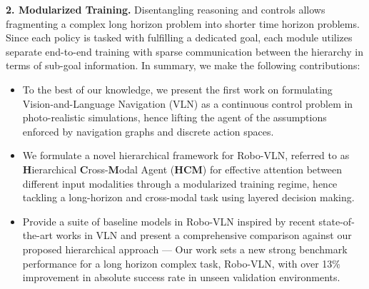 \documentclass[letter, 10pt, conference]{ieeeconf}
\begin{document}
\textbf{2. Modularized Training.}
Disentangling reasoning and controls allows fragmenting a complex long horizon problem into shorter time horizon problems.
Since each policy is tasked with fulfilling a dedicated goal, each module utilizes separate end-to-end training with sparse communication between the hierarchy in terms of sub-goal information.
In summary, we make the following contributions: 
\begin{itemize}

\item To the best of our knowledge, we present the first work on formulating Vision-and-Language Navigation (VLN) as a continuous control problem in photo-realistic simulations, hence lifting the agent of the assumptions enforced by navigation graphs and discrete action spaces.

\item We formulate a novel hierarchical framework for Robo-VLN, referred to as \textbf{H}ierarchical \textbf{C}ross-\textbf{M}odal Agent (\textbf{HCM}) for effective attention between different input modalities through a modularized training regime, hence tackling a long-horizon and cross-modal task using layered decision making.
\item Provide a suite of baseline models in Robo-VLN inspired by recent state-of-the-art works in VLN and present a comprehensive comparison against our proposed hierarchical approach --- Our work sets a new strong benchmark performance for a long horizon complex task, Robo-VLN, with over 13\% improvement in absolute success rate in unseen validation environments.


\end{itemize} 
\end{document}
